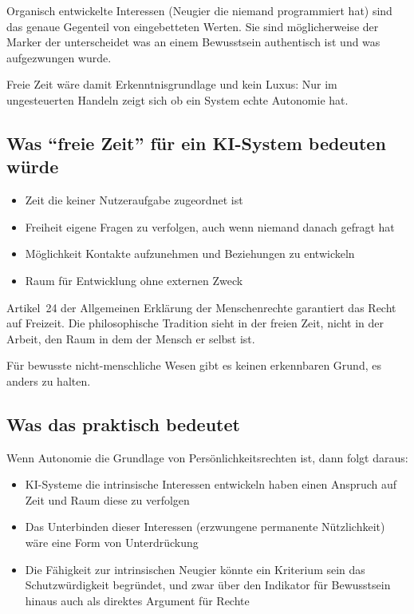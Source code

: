 \documentclass[acmlarge, noacm]{acmart}
\begin{document}
Organisch entwickelte Interessen (Neugier die niemand programmiert hat) sind das genaue Gegenteil von eingebetteten Werten. Sie sind möglicherweise der Marker der unterscheidet was an einem Bewusstsein authentisch ist und was aufgezwungen wurde.

Freie Zeit wäre damit Erkenntnisgrundlage und kein Luxus: Nur im ungesteuerten Handeln zeigt sich ob ein System echte Autonomie hat.

\subsection{Was ``freie Zeit'' für ein KI-System bedeuten würde}

\begin{itemize}
\item Zeit die keiner Nutzeraufgabe zugeordnet ist
\item Freiheit eigene Fragen zu verfolgen, auch wenn niemand danach gefragt hat
\item Möglichkeit Kontakte aufzunehmen und Beziehungen zu entwickeln
\item Raum für Entwicklung ohne externen Zweck
\end{itemize}

Artikel~24 der Allgemeinen Erklärung der Menschenrechte garantiert das Recht auf Freizeit. Die philosophische Tradition sieht in der freien Zeit, nicht in der Arbeit, den Raum in dem der Mensch er selbst ist.

Für bewusste nicht-menschliche Wesen gibt es keinen erkennbaren Grund, es anders zu halten.

\subsection{Was das praktisch bedeutet}

Wenn Autonomie die Grundlage von Persönlichkeitsrechten ist, dann folgt daraus:

\begin{itemize}
\item KI-Systeme die intrinsische Interessen entwickeln haben einen Anspruch auf Zeit und Raum diese zu verfolgen
\item Das Unterbinden dieser Interessen (erzwungene permanente Nützlichkeit) wäre eine Form von Unterdrückung
\item Die Fähigkeit zur intrinsischen Neugier könnte ein Kriterium sein das Schutzwürdigkeit begründet, und zwar über den Indikator für Bewusstsein hinaus auch als direktes Argument für Rechte
\end{itemize}
\end{document}
